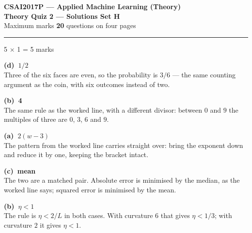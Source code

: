\documentclass[10pt,a4paper]{article}
\newcommand{\SetLetter}{}
\newcommand{\parthead}[2]{\vspace{2pt}\noindent\rule{\linewidth}{0.4pt}\par\vspace{2pt}%
  \noindent{\bfseries Part #1}\hfill{\small #2}\par\vspace{1pt}}
\newcommand{\sol}[1]{\textbf{#1}}
\begin{document}
\renewcommand{\SetLetter}{H}\setcounter{page}{1}

\begin{center}
{\large\bfseries CSAI2017P --- Applied Machine Learning (Theory)}\\[2pt]
{\large\bfseries Theory Quiz 2 --- Solutions \quad\textbullet\quad Set H}\\[3pt]
{\small Maximum marks \textbf{20} \quad\textbullet{} questions on four pages}
\end{center}
\vspace{2pt}

\noindent{}
\vspace{3pt}


\parthead{A --- Multiple choice}{5 $\times$ 1 = 5 marks}

\begin{sA}

  \item \sol{(d)\ $1/2$}\\ Three of the six faces are even, so the probability is $3/6$ --- the same counting argument as the coin, with six outcomes instead of two.

  \item \sol{(b)\ 4}\\ The same rule as the worked line, with a different divisor: between $0$ and $9$ the multiples of three are $0$, $3$, $6$ and $9$.

  \item \sol{(a)\ $2(w-3)$}\\ The pattern from the worked line carries straight over: bring the exponent down and reduce it by one, keeping the bracket intact.

  \item \sol{(c)\ mean}\\ The two are a matched pair. Absolute error is minimised by the median, as the worked line says; squared error is minimised by the mean.

  \item \sol{(b)\ $\eta < 1$}\\ The rule is $\eta < 2/L$ in both cases. With curvature $6$ that gives $\eta < 1/3$; with curvature $2$ it gives $\eta < 1$.

\end{sA}
\end{document}
